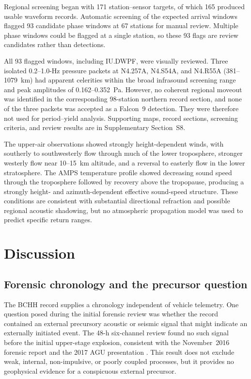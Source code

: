 \documentclass[]{seismica}
\begin{document}
Regional screening began with 171 station--sensor targets, of which 165
produced usable waveform records. Automatic screening of the expected arrival
windows flagged 93 candidate phase windows at 67 stations for manual review.
Multiple phase windows could be flagged at a single station, so these 93 flags
are review candidates rather than detections.

All 93 flagged windows, including IU.DWPF, were visually reviewed. Three
isolated 0.2--1.0-Hz pressure packets at N4.257A, N4.S54A, and N4.R55A
(381--1079~km) had apparent celerities within the broad infrasound screening
range and peak amplitudes of 0.162--0.352~Pa. However, no coherent regional
moveout was identified in the corresponding 98-station northern record
section, and none of the three packets was accepted as a Falcon~9 detection.
They were therefore not used for period--yield analysis. Supporting maps,
record sections, screening criteria, and review results are in Supplementary
Section~S8.

The upper-air observations showed strongly height-dependent winds, with
southerly to southwesterly flow through much of the lower troposphere, stronger
westerly flow near 10--15~km altitude, and a reversal to easterly flow in the
lower stratosphere. The AMPS temperature profile showed decreasing sound speed
through the troposphere followed by recovery above the tropopause, producing a
strongly height- and azimuth-dependent effective sound-speed structure. These
conditions are consistent with substantial directional refraction and possible
regional acoustic shadowing, but no atmospheric propagation model was used to
predict specific return ranges.


\section{Discussion}
\label{sec:discussion}

\subsection{Forensic chronology and the precursor question}

The BCHH record supplies a chronology independent of vehicle telemetry. One
question posed during the initial forensic review was whether the record
contained an external precursory acoustic or seismic signal that might indicate
an externally initiated event. The 48-h six-channel review found no such signal
before the initial upper-stage explosion, consistent with the November~2016
forensic report \citep{thompson_mcnutt_fireball_2016} and the 2017 AGU
presentation \citep{thompson_agu_falcon9_2017}. This result does not exclude
weak, internal, non-impulsive, or poorly coupled processes, but it provides no
geophysical evidence for a conspicuous external precursor.
\end{document}
